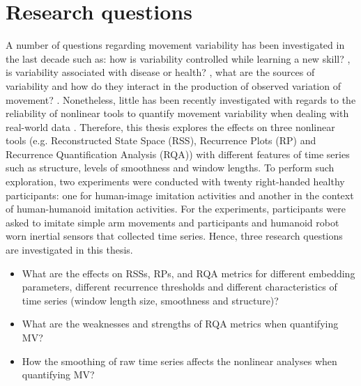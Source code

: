 \section{Research questions}
A number of questions regarding movement variability has been investigated
in the last decade \citep{stergiou2006, stergiou2011} such as: 
how is variability controlled 
while learning a new skill? \citep{wagner2012, seifert2011, bartlett2007}, 
is variability associated with disease or health? 
\citep{stergiou2006, stergiou2011}, what are the sources of variability 
and how do they interact in the production of observed variation 
of movement? \citep{preatoni2007, preatoni2010, preatoni2013}.
Nonetheless, little has been recently investigated with regards to the 
reliability of nonlinear tools to quantify movement 
variability \citep{iwanski1998, yao2017}
when dealing with real-world data \citep{bradley2015, caballero2014}.
Therefore, this thesis explores the effects on three nonlinear tools
(e.g. Reconstructed State Space (RSS), Recurrence Plots (RP) and 
Recurrence Quantification Analysis (RQA)) with different features 
of time series such as structure, levels of smoothness and window lengths.
To perform such exploration, two experiments were conducted with twenty 
right-handed healthy participants: one for human-image imitation 
activities and another in the context of human-humanoid imitation 
activities.
For the experiments, participants were asked to imitate simple arm movements
and participants and humanoid robot worn inertial sensors that collected 
time series.
Hence, three research questions are investigated in this thesis.

\begin{itemize}

\item What are the effects on RSSs, RPs, and RQA metrics
	for different embedding parameters, different recurrence thresholds 
	and different characteristics of time series 
	(window length size, smoothness and structure)?

\item What are the weaknesses and strengths of RQA metrics when quantifying MV?

\item How the smoothing of raw time series affects the nonlinear analyses
	when quantifying MV?
 

\end{itemize}




